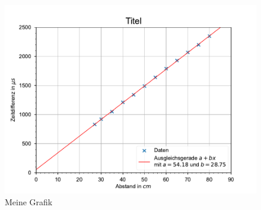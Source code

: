 \documentclass[11pt, a4paper]{article}
\begin{document}
    \begin{figure}[h]
        
        \includegraphics{./2Mikros.pdf}

        \caption{Meine Grafik}
        \label{fig:meine-grafik}
    \end{figure}
\end{document}
